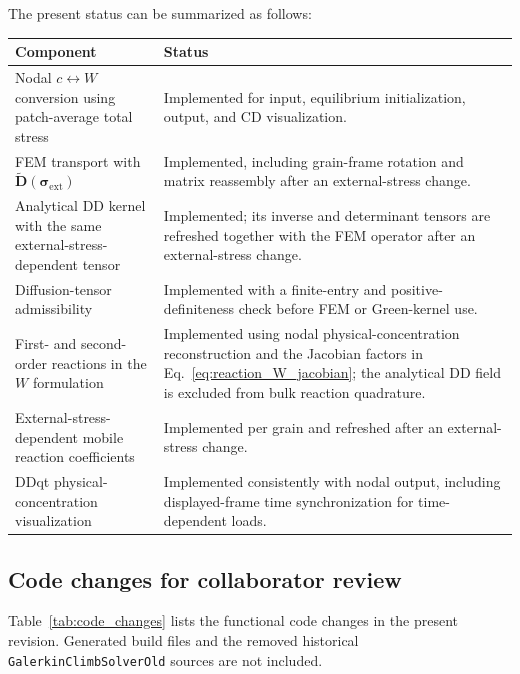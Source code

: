 \documentclass[10pt]{article}
\begin{document}
The present status can be summarized as follows:
\begin{center}
\renewcommand{\arraystretch}{1.2}
\begin{tabular}{|p{}|p{}|}
\hline
Component & Status \\
\hline
Nodal $c\leftrightarrow W$ conversion using patch-average total stress
& Implemented for input, equilibrium initialization, output, and CD visualization. \\
\hline
FEM transport with
$\widetilde{\boldsymbol{D}}(\boldsymbol{\sigma}_{\mathrm{ext}})$
& Implemented, including grain-frame rotation and matrix reassembly after an external-stress change. \\
\hline
Analytical DD kernel with the same external-stress-dependent tensor
& Implemented; its inverse and determinant tensors are refreshed together with the FEM operator after an external-stress change. \\
\hline
Diffusion-tensor admissibility
& Implemented with a finite-entry and positive-definiteness check before FEM or Green-kernel use. \\
\hline
First- and second-order reactions in the $W$ formulation
& Implemented using nodal physical-concentration reconstruction and the Jacobian factors in Eq.~\eqref{eq:reaction_W_jacobian}; the analytical DD field is excluded from bulk reaction quadrature. \\
\hline
External-stress-dependent mobile reaction coefficients
& Implemented per grain and refreshed after an external-stress change. \\
\hline
DDqt physical-concentration visualization
& Implemented consistently with nodal output, including displayed-frame time synchronization for time-dependent loads. \\
\hline
\end{tabular}
\end{center}

\subsection{Code changes for collaborator review}

Table~\ref{tab:code_changes} lists the functional code changes in the present
revision.  Generated build files and the removed historical
\texttt{GalerkinClimbSolverOld} sources are not included.
\end{document}
